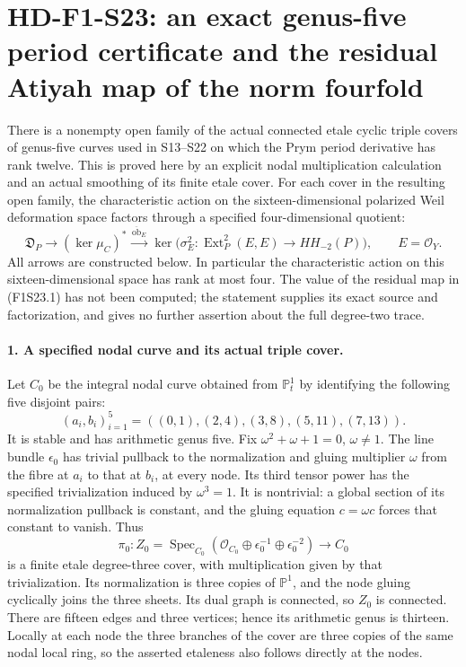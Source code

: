 \section[HD-F1-S23: the actual four-dimensional residual obstruction]{HD-F1-S23: an exact genus-five period certificate and the residual Atiyah map of the norm fourfold}
\label{sec:f1-norm-fourfold-period-obstruction}

There is a nonempty open family of the actual connected etale cyclic
triple covers of genus-five curves used in S13--S22 on which the Prym
period derivative has rank twelve. This is proved here by an explicit
nodal multiplication calculation and an actual smoothing of its finite
etale cover. For each cover in the resulting open family, the
characteristic action on the sixteen-dimensional polarized Weil
deformation space factors through a specified four-dimensional quotient:
\[
 \mathfrak D_P\longrightarrow(\ker\mu_C)^*
       \xrightarrow{\,\overline{\operatorname{ob}}_E\,}
       \ker\bigl(\sigma_E^2:\operatorname{Ext}^2_P(E,E)
                                      \longrightarrow HH_{-2}(P)\bigr),
 \qquad E=\mathcal O_Y.
 \tag{F1S23.1}
\]
All arrows are constructed below. In particular the characteristic
action on this sixteen-dimensional space has rank at most four.
The value of the residual map in (F1S23.1) has not been computed;
the statement supplies its exact source and factorization, and gives
no further assertion about the full degree-two trace.

\paragraph{1. A specified nodal curve and its actual triple cover.}
Let $C_0$ be the integral nodal curve obtained from $\mathbb P^1_t$
by identifying the following five disjoint pairs:
\[
 (a_i,b_i)_{i=1}^5=((0,1),(2,4),(3,8),(5,11),(7,13)).
 \tag{F1S23.2}
\]
It is stable and has arithmetic genus five. Fix
$\omega^2+\omega+1=0$, $\omega\ne1$. The line bundle
$\epsilon_0$ has trivial pullback to the normalization and gluing
multiplier $\omega$ from the fibre at $a_i$ to that at $b_i$,
at every node. Its third tensor power has the specified trivialization
induced by $\omega^3=1$. It is nontrivial: a global section of
its normalization pullback is constant, and the gluing equation
$c=\omega c$ forces that constant to vanish. Thus
\[
 \pi_0:Z_0=\operatorname{Spec}_{C_0}
   (\mathcal O_{C_0}\oplus\epsilon_0^{-1}
                         \oplus\epsilon_0^{-2})\longrightarrow C_0
 \tag{F1S23.3}
\]
is a finite etale degree-three cover, with multiplication given by
that trivialization. Its normalization is three copies of
$\mathbb P^1$, and the node gluing cyclically joins the three
sheets. Its dual graph is connected, so $Z_0$ is connected.
There are fifteen edges and three vertices; hence its arithmetic
genus is thirteen. Locally at each node the three branches of the
cover are three copies of the same nodal local ring, so the asserted
etaleness also follows directly at the nodes.


